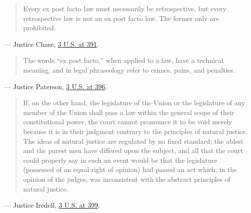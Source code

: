 \documentclass[12pt]{article}
\begin{document}
\begin{quote}
Every ex post facto law must necessarily be retrospective, but every retrospective law is not an ex post facto law. The former only are prohibited.
\end{quote}
\noindent --- Justice Chase, \href{https://supreme.justia.com/cases/federal/us/3/386/}{3 U.S. at 391}.

\begin{quote}
The words ``ex post facto,'' when applied to a law, have a technical meaning, and in legal phraseology refer to crimes, pains, and penalties.
\end{quote}
\noindent --- Justice Paterson, \href{https://supreme.justia.com/cases/federal/us/3/386/}{3 U.S. at 396}.

\begin{quote}
If, on the other hand, the legislature of the Union or the legislature of any member of the Union shall pass a law within the general scope of their constitutional power, the court cannot pronounce it to be void merely because it is in their judgment contrary to the principles of natural justice. The ideas of natural justice are regulated by no fixed standard; the ablest and the purest men have differed upon the subject, and all that the court could properly say in such an event would be that the legislature (possessed of an equal right of opinion) had passed an act which, in the opinion of the judges, was inconsistent with the abstract principles of natural justice.
\end{quote}
\noindent --- Justice Iredell, \href{https://supreme.justia.com/cases/federal/us/3/386/}{3 U.S. at 399}.
\end{document}
